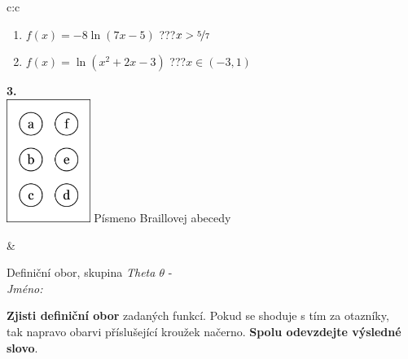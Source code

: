 \documentclass[10pt]{report}
\begin{document}
\begin{tabular}{c:c}
\begin{minipage}[c][104.5mm][t]{0.5\linewidth}
\begin{center}
\begin{minipage}{0.79\linewidth}
\begin{center}
\begin{varwidth}{\linewidth}
\begin{enumerate}
\item $f(x)=-8\ln{(7x-5)}$\quad \dotfill\; ???\;\dotfill \quad $x>\nicefrac{5}{7}$
\item $f(x)=\ln{(x^2+2x-3)}$\quad \dotfill\; ???\;\dotfill \quad $x\in(-3 , 1)$
\end{enumerate}
\end{varwidth}
\end{center}
\end{minipage}
\begin{minipage}{0.20\linewidth}
\begin{center}
{\Huge\bfseries 3.} \\[2mm]
\includegraphics[height=40mm]{../images/braille.png}
{\small Písmeno Braillovej abecedy}
\end{center}
\end{minipage}
\end{center}
\end{minipage}
&
\begin{minipage}[c][104.5mm][t]{0.5\linewidth}
\begin{center}
\vspace{7mm}
{\huge Definiční obor, skupina \textit{Theta $\theta$} -}\\[5mm]
\textit{Jméno:}\phantom{xxxxxxxxxxxxxxxxxxxxxxxxxxxxxxxxxxxxxxxxxxxxxxxxxxxxxxxxxxxxxxxxx}\\[5mm]
\begin{minipage}{0.95\linewidth}
\begin{center}
\textbf{Zjisti definiční obor} zadaných funkcí. Pokud se shoduje s tím za otazníky,\\tak napravo obarvi příslušející kroužek načerno. \textbf{Spolu odevzdejte výsledné slovo}.
\end{center}
\end{minipage}
\\[1mm]
\begin{minipage}{0.79\linewidth}
\begin{center}
\begin{varwidth}{\linewidth}
\begin{enumerate}
\normalsizerrr

\end{enumerate}
\end{varwidth}
\end{center}
\end{minipage}
\end{center}
\end{minipage}
\end{tabular}
\end{document}
